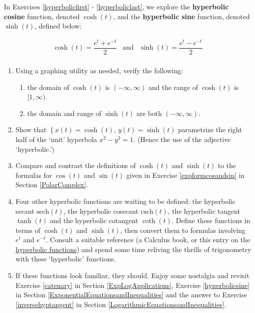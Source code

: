 \documentclass{ximera}
\begin{document}
\label{hyperboliccosinesine} 

In Exercises \ref{hyperbolicfirst} - \ref{hyperboliclast}, we explore the  \textbf{hyperbolic cosine} function, denoted $\cosh(t)$, and the \textbf{hyperbolic sine}
function, denoted $\sinh(t)$, defined below:

\[ \begin{array}{ccc}

\cosh(t) = \dfrac{e^{t} + e^{-t}}{2} & 
\text{and} & \sinh(t) = \dfrac{e^{t} - e^{-t}}{2} \\

\end{array} \]

\begin{enumerate}
\setcounter{enumi}{\value{HW}}

\item  Using a graphing utility as needed, verify the following:  \label{hyperbolicfirst}

\begin{enumerate}

\item the domain of $\cosh(t)$ is $(-\infty, \infty)$ and the range of $\cosh(t)$ is $[1,\infty)$.

\item  the domain and range  of $\sinh(t)$ are both $(-\infty, \infty)$.

\end{enumerate}

\item  Show that $\left\{ x(t) = \cosh(t), \, y(t) = \sinh(t) \right.$ parametrize the right half of the `unit' hyperbola $x^2 - y^2 = 1$.  (Hence the use of the adjective `hyperbolic.')

\item  Compare and contrast the definitions of $\cosh(t)$ and $\sinh(t)$ to the formulas for $\cos(t)$ and $\sin(t)$ given in Exercise \ref{expformcosandsin} in Section \ref{PolarComplex}.

\item \label{andtheresthyperbolic} Four other hyperbolic functions are waiting to be defined:  the hyperbolic secant $\text{sech}(t)$, the hyperbolic cosecant $\text{csch}(t)$, the hyperbolic tangent $\tanh(t)$ and the hyperbolic cotangent $\coth(t)$.  Define these functions in terms of $\cosh(t)$ and $\sinh(t)$, then convert them to formulas involving $e^{t}$ and $e^{-t}$.  Consult a suitable reference (a Calculus book, or this entry on the \href{http://en.wikipedia.org/wiki/Hyperbolic_function}{\underline{hyperbolic functions}}) and spend some time reliving the thrills of trigonometry with these `hyperbolic' functions.

\item  If these functions look familiar, they should.  Enjoy some nostalgia and revisit Exercise \ref{catenary} in Section \ref{ExpLogApplications}, Exercise \ref{hyperbolicsine} in Section \ref{ExponentialEquationsandInequalities} and the  answer to Exercise \ref{inversehyptangent} in Section \ref{LogarithmicEquationsandInequalities}. \label{hyperboliclast}

\end{enumerate}
\end{document}
